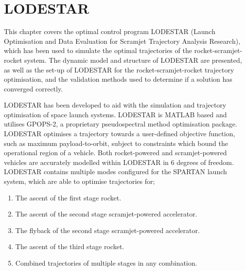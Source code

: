 
\cleardoublepage
\chapter{LODESTAR}\label{chapter:LODESTAR}	
This chapter covers the optimal control program LODESTAR (Launch Optimisation and Data Evaluation for Scramjet Trajectory Analysis Research), which has been used to simulate the optimal trajectories of the rocket-scramjet-rocket system. The dynamic model and structure of LODESTAR are presented, as well as the set-up of LODESTAR for the rocket-scramjet-rocket trajectory optimisation, and the validation methods used to determine if a solution has converged correctly.

LODESTAR has been developed to aid with the simulation and trajectory optimisation of space launch systems. 
LODESTAR is MATLAB based and utilises GPOPS-2, a proprietary pseudospectral method optimisation package.
 LODESTAR optimises a trajectory towards a user-defined objective function, such as maximum payload-to-orbit, subject to constraints which bound the operational region of a vehicle. Both rocket-powered and scramjet-powered vehicles are accurately modelled within LODESTAR in 6 degrees of freedom. LODESTAR contains multiple modes configured for the SPARTAN launch system, which are able to optimise trajectories for;

\begin{enumerate}
 \item The ascent of the first stage rocket.
 \item The ascent of the second stage scramjet-powered accelerator.
 \item The flyback of the second stage scramjet-powered accelerator.
 \item The ascent of the third stage rocket.
 \item Combined trajectories of multiple stages in any combination.
\end{enumerate}

